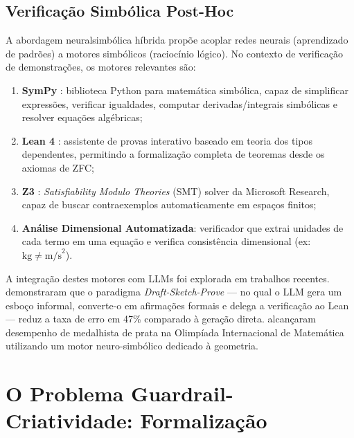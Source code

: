 \documentclass[5p]{elsarticle}
\theoremstyle{remark}
\begin{document}
\subsection{Verificação Simbólica Post-Hoc}

A abordagem neuralsimbólica híbrida \cite{Garcez2020Neurosymbolic} propõe acoplar redes neurais (aprendizado de padrões) a motores simbólicos (raciocínio lógico). No contexto de verificação de demonstrações, os motores relevantes são:

\begin{enumerate}[label=(\alph*)]
    \item \textbf{SymPy} \cite{Meurer2017SymPy}: biblioteca Python para matemática simbólica, capaz de simplificar expressões, verificar igualdades, computar derivadas/integrais simbólicas e resolver equações algébricas;
    \item \textbf{Lean 4} \cite{Moura2021Lean4}: assistente de provas interativo baseado em teoria dos tipos dependentes, permitindo a formalização completa de teoremas desde os axiomas de ZFC;
    \item \textbf{Z3} \cite{Moura2008Z3}: \textit{Satisfiability Modulo Theories} (SMT) solver da Microsoft Research, capaz de buscar contraexemplos automaticamente em espaços finitos;
    \item \textbf{Análise Dimensional Automatizada}: verificador que extrai unidades de cada termo em uma equação e verifica consistência dimensional (ex: $\text{kg} \neq \text{m/s}^2$).
\end{enumerate}

A integração destes motores com LLMs foi explorada em trabalhos recentes. \cite{Jiang2023DraftSketchProve} demonstraram que o paradigma \textit{Draft-Sketch-Prove} --- no qual o LLM gera um esboço informal, converte-o em afirmações formais e delega a verificação ao Lean --- reduz a taxa de erro em 47\% comparado à geração direta. \cite{Zheng2024AlphaGeometry} alcançaram desempenho de medalhista de prata na Olimpíada Internacional de Matemática utilizando um motor neuro-simbólico dedicado à geometria.

\section{O Problema Guardrail-Criatividade: Formalização}
\end{document}

